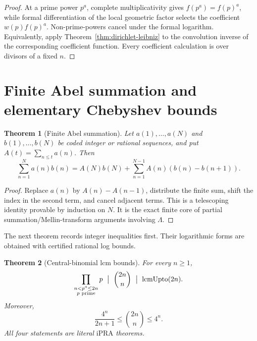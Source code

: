 \documentclass[11pt]{article}
\newtheorem{theorem}{Theorem}[section]
\theoremstyle{definition}
\newcommand{\ipra}{\mathrm{iPRA}}
\newcommand{\lcmu}{\operatorname{lcmUpto}}
\begin{document}
\begin{proof}
At a prime power \(p^a\), complete multiplicativity gives
\(f(p^a)=f(p)^a\), while formal differentiation of the local geometric factor
selects the coefficient \(w(p)f(p)^a\).  Non-prime-powers cancel under the
formal logarithm.  Equivalently, apply Theorem~\ref{thm:dirichlet-leibniz} to
the convolution inverse of the corresponding coefficient function.  Every
coefficient calculation is over divisors of a fixed \(n\).
\end{proof}

\section{Finite Abel summation and elementary Chebyshev bounds}

\begin{theorem}[Finite Abel summation]\label{thm:abel}
Let \(a(1),\ldots,a(N)\) and \(b(1),\ldots,b(N)\) be coded integer or rational
sequences, and put \(A(t)=\sum_{n\le t}a(n)\).  Then
\[
 \boxed{\displaystyle
 \sum_{n=1}^{N}a(n)b(n)
 =A(N)b(N)+\sum_{n=1}^{N-1}A(n)(b(n)-b(n+1)).}
\]
\end{theorem}

\begin{proof}
Replace \(a(n)\) by \(A(n)-A(n-1)\), distribute the finite sum, shift the
index in the second term, and cancel adjacent terms.  This is a telescoping
identity provable by induction on \(N\).  It is the exact finite core of
partial summation/Mellin-transform arguments involving \(\Lambda\).
\end{proof}

The next theorem records integer inequalities first.  Their logarithmic forms
are obtained with certified rational log bounds.

\begin{theorem}[Central-binomial lcm bounds]\label{thm:binomial-lcm}
For every \(n\ge1\),
\[
 \prod_{\substack{n<p^a\le2n\\p\text{ prime}}}p
 \ \bigm|\ \binom{2n}{n}
 \ \bigm|\ \lcmu(2n).
\]
Moreover,
\[
 \frac{4^n}{2n+1}\le \binom{2n}{n}\le4^n.
\]
All four statements are literal \(\ipra\) theorems.
\end{theorem}
\end{document}
